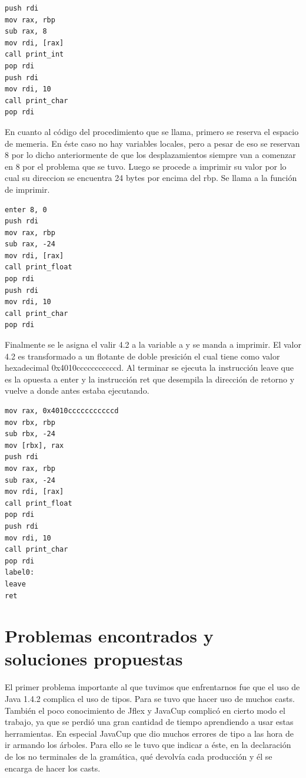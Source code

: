 \documentclass[11pt, spanish]{report}
\begin{document}
\begin{verbatim}
push rdi
mov rax, rbp
sub rax, 8
mov rdi, [rax]
call print_int
pop rdi
push rdi
mov rdi, 10
call print_char
pop rdi
\end{verbatim}

En cuanto al c\'odigo del procedimiento que se llama, primero se reserva el espacio de memeria. En \'este caso no hay variables locales, pero
a pesar de eso se reservan 8 por lo dicho anteriormente de que los desplazamientos siempre van a comenzar en 8 por el problema que se tuvo.
Luego se procede a imprimir su valor por lo cual su direccion se encuentra 24 bytes por encima del rbp. Se llama a la funci\'on de imprimir.

\begin{verbatim}
enter 8, 0
push rdi
mov rax, rbp
sub rax, -24
mov rdi, [rax]
call print_float
pop rdi
push rdi
mov rdi, 10
call print_char
pop rdi
\end{verbatim}

Finalmente se le asigna el valir 4.2 a la variable a y se manda a imprimir. El valor 4.2 es transformado a un flotante de doble presici\'on el 
cual tiene como valor hexadecimal 0x4010cccccccccccd. Al terminar se ejecuta la instrucci\'on leave que es la opuesta a enter y la instrucci\'on
ret que desempila la direcci\'on de retorno y vuelve a donde antes estaba ejecutando.

\begin{verbatim}
mov rax, 0x4010cccccccccccd
mov rbx, rbp
sub rbx, -24
mov [rbx], rax
push rdi
mov rax, rbp
sub rax, -24
mov rdi, [rax]
call print_float
pop rdi
push rdi
mov rdi, 10
call print_char
pop rdi
label0:
leave
ret
\end{verbatim}

\newpage

\section{Problemas encontrados y soluciones propuestas}

El primer problema importante al que tuvimos que enfrentarnos fue que el uso de Java 1.4.2 complica el uso de tipos. Para se tuvo que hacer uso de muchos casts. \\

Tambi\'en el poco conocimiento de Jflex y JavaCup complic\'o en cierto modo el trabajo, ya que se perdi\'o una gran cantidad de tiempo aprendiendo a usar estas 
herramientas. En especial JavaCup que dio muchos errores de tipo a las hora de ir armando los \'arboles. Para ello se le tuvo que indicar a \'este, en la declaraci\'on
de los no terminales de la gram\'atica, qu\'e devolv\'ia cada producci\'on y \'el se encarga de hacer los casts.\\
\end{document}
